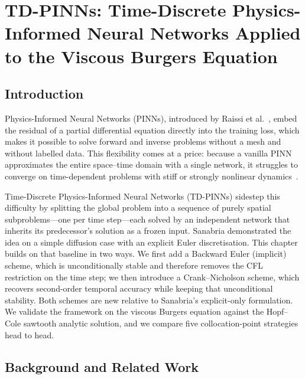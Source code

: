 \chapter{TD-PINNs: Time-Discrete Physics-Informed Neural Networks
         Applied to the Viscous Burgers Equation}

\section*{Introduction}

Physics-Informed Neural Networks (PINNs), introduced by Raissi et
al.~\cite{Raissi2019}, embed the residual of a partial differential equation
directly into the training loss, which makes it possible to solve forward and
inverse problems without a mesh and without labelled data. This flexibility
comes at a price: because a vanilla PINN approximates the entire space--time
domain with a single network, it struggles to converge on time-dependent
problems with stiff or strongly nonlinear dynamics~\cite{Krishnapriyan2021}.

Time-Discrete Physics-Informed Neural Networks (TD-PINNs) sidestep this
difficulty by splitting the global problem into a sequence of purely spatial
subproblems---one per time step---each solved by an independent network that
inherits its predecessor's solution as a frozen input. Sanabria
\citeyear{pipe} demonstrated the idea on a simple diffusion case with an
explicit Euler discretisation. This chapter builds on that baseline in two
ways. We first add a Backward Euler (implicit) scheme, which is
unconditionally stable and therefore removes the CFL restriction on the time
step; we then introduce a Crank--Nicholson scheme, which recovers second-order
temporal accuracy while keeping that unconditional stability. Both schemes are
new relative to Sanabria's \citeyear{pipe} explicit-only formulation. We
validate the framework on the viscous Burgers equation against the Hopf--Cole
sawtooth analytic solution, and we compare five collocation-point strategies
head to head.

\section{Background and Related Work}


